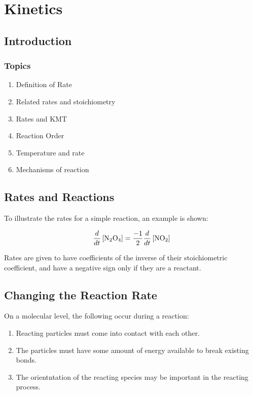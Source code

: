 \chapter{Kinetics}
\section{Introduction}
\subsection{Topics}
\begin{enumerate}
  \item Definition of Rate
  \item Related rates and stoichiometry
  \item Rates and KMT
  \item Reaction Order
  \item Temperature and rate
  \item Mechanisms of reaction
\end{enumerate}

\section{Rates and Reactions}
To illustrate the rates for a simple reaction, an example is shown:



\begin{equation}
  \frac{d}{dt}\left[\ce{N2O4}\right] = \frac{-1}{2}\frac{d}{dt}\left[\ce{NO2}\right]
\end{equation}

Rates are given to have coefficients of the inverse of their stoichiometric
coefficient, and have a negative sign only if they are a reactant.

\section{Changing the Reaction Rate}
On a molecular level, the following occur during a reaction:
\begin{enumerate}
  \item Reacting particles must come into contact with each other.
  \item The particles must have some amount of energy available to break
    existing bonds.
  \item The orientntation of the reacting species may be important in the
    reacting process.
\end{enumerate}

